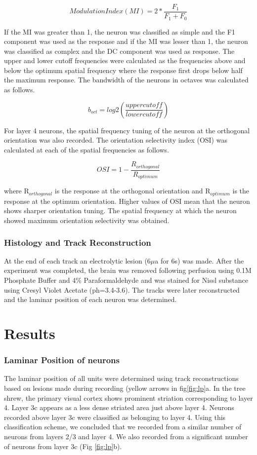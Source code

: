 \[Modulation Index (MI)= 2*\frac{F_1}{F_1+F_0}\]

If the MI was greater than 1, the neuron was classified as simple and the F1 component was used as the response and if the MI was lesser than 1, the neuron was classified as complex and the DC component was used as response. The upper and lower cutoff frequencies were calculated as the frequencies above and below the optimum spatial frequency where the response first drops below half the maximum response.  The bandwidth of the neurons in octaves was calculated as follows.

\[b_{oct}= log2(\frac{upper cutoff}{lower cutoff})\]

For layer 4 neurons, the spatial frequency tuning of the neuron at the orthogonal orientation was also recorded. The orientation selectivity index (OSI) was calculated at each of the spatial frequencies as follows.

\[OSI= 1-\frac{R_{orthogonal}}{R_{optimum}}\]

where R$_{orthogonal}$ is the response at the orthogonal orientation and R$_{optimum}$ is the response at the optimum orientation. Higher values of OSI mean that the neuron shows sharper orientation tuning. The spatial frequency at which the neuron showed maximum orientation selectivity was obtained.
\subsubsection{Histology and Track Reconstruction}

At the end of each track an electrolytic lesion (6$\mu$a for 6s) was made. After the experiment was completed, the brain was removed following perfusion using 0.1M Phosphate Buffer and 4\% Paraformaldehyde and was stained for Nissl substance using Cresyl Violet Acetate (ph=3.4-3.6). The tracks were later reconstructed and the laminar position of each neuron was determined.
\section{Results}

\subsubsection{Laminar Position of neurons}

The laminar position of all units were determined using track reconstructions based on lesions made during recording (yellow arrows in fig\ref{fig:lp}a. In the tree shrew, the primary visual cortex shows prominent striation corresponding to layer 4. Layer 3c appears as a less dense striated area just above layer 4. Neurons recorded above layer 3c were classified as belonging to layer 4. Using this classification scheme, we concluded that we recorded from a similar number of neurons from layers 2/3 and layer 4. We also recorded from a significant number of neurons from layer 3c (Fig \ref{fig:lp}b).

